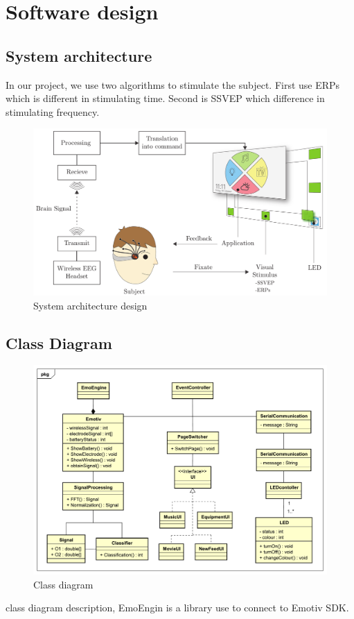 \chapter{Software design}

\label{ch:Software design}

\setlength{\parindent}{4em}
\setlength{\parskip}{1em}
\renewcommand{\baselinestretch}{1.5}

\section{System architecture}

\hspace{1.5cm}In our project, we use two algorithms to stimulate the subject. First use ERPs which is different in stimulating time. Second is SSVEP which difference in stimulating frequency.

\begin{figure}[ht]
	\centering
	\includegraphics[scale = 0.28]{chapter5/architec.pdf}
	\caption{System architecture design}
\end{figure}

\newpage
\section{Class Diagram}

\begin{figure}[ht]
	\centering
	\includegraphics[scale = 0.5]{chapter5/Class.pdf}
	\caption{Class diagram}
\end{figure}

class diagram description, EmoEngin is a library use to connect to Emotiv SDK.